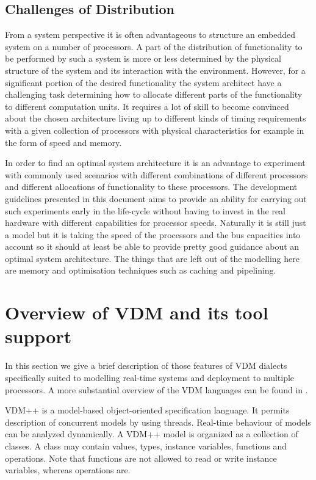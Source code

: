 \documentclass{overturerepchap}
\begin{document}
\subsection{Challenges of Distribution}

From a system perspective it is often advantageous to structure an 
embedded system on a number of processors. A part of the distribution
of functionality to be performed by such a system is more or less
determined by the physical structure of the system and its interaction
with the environment. However, for a significant portion of the desired 
functionality the system architect have a challenging task determining 
how to allocate different parts of the functionality to different 
computation units. It requires a lot of skill to become convinced
about the chosen architecture living up to different kinds of timing 
requirements with a given collection of processors with physical 
characteristics for example in the form of speed and memory. 

In order to find an optimal system architecture it is an advantage
to experiment with commonly used scenarios with different combinations of 
different processors and different allocations of functionality to 
these processors. The development guidelines presented in this document
aims to provide an ability for carrying out such experiments early in
the life-cycle without having to invest in the real hardware with 
different capabilities for processor speeds. Naturally it is still just a
model but it is taking the speed of the processors and the bus capacities 
into account so it should at least be able to provide pretty good guidance
about an optimal system architecture. The things that are left out of
the modelling here are memory and optimisation techniques such as caching
and pipelining.

\section{Overview of VDM and its tool support}

In this section we give a brief description of those features of VDM
dialects specifically suited to modelling real-time systems and
deployment to multiple processors. A more substantial overview of the
VDM languages can be found in \cite{LangManPP}.

VDM++ is a model-based object-oriented specification language. It
permits description of concurrent models by using threads. Real-time
behaviour of models can be analyzed dynamically. A VDM++ model is
organized as a collection of classes. A class may contain values,
types, instance variables, functions and operations. Note that
functions are not allowed to read or write instance variables, whereas
operations are.
\end{document}
